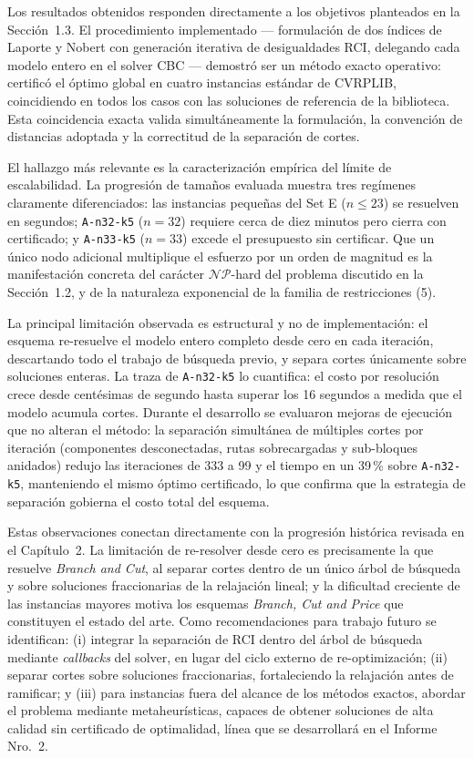 Los resultados obtenidos responden directamente a los objetivos planteados en
la Sección~1.3. El procedimiento implementado --- formulación de dos índices
de Laporte y Nobert con generación iterativa de desigualdades RCI, delegando
cada modelo entero en el solver CBC --- demostró ser un método exacto
operativo: certificó el óptimo global en cuatro instancias estándar de
CVRPLIB, coincidiendo en todos los casos con las soluciones de referencia de
la biblioteca. Esta coincidencia exacta valida simultáneamente la formulación,
la convención de distancias adoptada y la correctitud de la separación de
cortes.

El hallazgo más relevante es la caracterización empírica del límite de
escalabilidad. La progresión de tamaños evaluada muestra tres regímenes
claramente diferenciados: las instancias pequeñas del Set E ($n \le 23$) se
resuelven en segundos; \texttt{A-n32-k5} ($n=32$) requiere cerca de diez
minutos pero cierra con certificado; y \texttt{A-n33-k5} ($n=33$) excede el
presupuesto sin certificar. Que un único nodo adicional multiplique el
esfuerzo por un orden de magnitud es la manifestación concreta del carácter
$\mathcal{NP}$-hard del problema discutido en la Sección~1.2, y de la
naturaleza exponencial de la familia de restricciones (5).

La principal limitación observada es estructural y no de implementación: el
esquema re-resuelve el modelo entero completo desde cero en cada iteración,
descartando todo el trabajo de búsqueda previo, y separa cortes únicamente
sobre soluciones enteras. La traza de \texttt{A-n32-k5} lo cuantifica: el
costo por resolución crece desde centésimas de segundo hasta superar los 16
segundos a medida que el modelo acumula cortes. Durante el desarrollo se
evaluaron mejoras de ejecución que no alteran el método: la separación
simultánea de múltiples cortes por iteración (componentes desconectadas,
rutas sobrecargadas y sub-bloques anidados) redujo las iteraciones de 333 a
99 y el tiempo en un 39\,\% sobre \texttt{A-n32-k5}, manteniendo el mismo
óptimo certificado, lo que confirma que la estrategia de separación gobierna
el costo total del esquema.

Estas observaciones conectan directamente con la progresión histórica revisada
en el Capítulo~2. La limitación de re-resolver desde cero es precisamente la
que resuelve \textit{Branch and Cut}, al separar cortes dentro de un único
árbol de búsqueda y sobre soluciones fraccionarias de la relajación lineal; y
la dificultad creciente de las instancias mayores motiva los esquemas
\textit{Branch, Cut and Price} que constituyen el estado del arte. Como
recomendaciones para trabajo futuro se identifican: (i) integrar la separación
de RCI dentro del árbol de búsqueda mediante \textit{callbacks} del solver, en
lugar del ciclo externo de re-optimización; (ii) separar cortes sobre
soluciones fraccionarias, fortaleciendo la relajación antes de ramificar; y
(iii) para instancias fuera del alcance de los métodos exactos, abordar el
problema mediante metaheurísticas, capaces de obtener soluciones de alta
calidad sin certificado de optimalidad, línea que se desarrollará en el
Informe Nro.~2.
